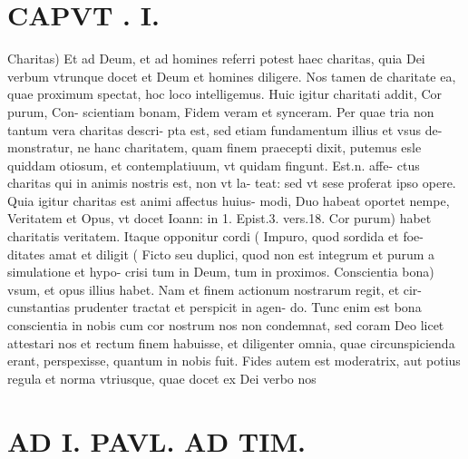 \documentclass{article}
\begin{document}
\begin{pages}
\section*{CAPVT . I. }
\marginpar{[ p.15 ]}\pstart Charitas) Et ad Deum, et ad homines referri potest haec charitas, quia Dei verbum vtrunque docet et Deum et homines diligere. Nos tamen de charitate ea, quae proximum spectat, hoc loco intelligemus. Huic igitur charitati addit, Cor purum, Con- scientiam bonam, Fidem veram et synceram. Per quae tria non tantum vera charitas descri- pta est, sed etiam fundamentum illius et vsus de- monstratur, ne hanc charitatem, quam finem praecepti dixit, putemus esle quiddam otiosum, et contemplatiuum, vt quidam fingunt. Est.n. affe- ctus charitas qui in animis nostris est, non vt la- teat: sed vt sese proferat ipso opere. Quia igitur charitas est animi affectus huius- modi, Duo habeat oportet nempe, Veritatem et Opus, vt docet Ioann: in 1. Epist.3. vers.18. Cor purum) habet charitatis veritatem. Itaque opponitur cordi ( Impuro, quod sordida et foe- ditates amat et diligit ( Ficto seu duplici, quod non est integrum et purum a simulatione et hypo- crisi tum in Deum, tum in proximos. Conscientia bona) vsum, et opus illius habet. Nam et finem actionum nostrarum regit, et cir- cunstantias prudenter tractat et perspicit in agen- do. Tunc enim est bona conscientia in nobis cum cor nostrum nos non condemnat, sed coram Deo licet attestari nos et rectum finem habuisse, et diligenter omnia, quae circunspicienda erant, perspexisse, quantum in nobis fuit. Fides autem est moderatrix, aut potius regula et norma vtriusque, quae docet ex Dei verbo nos  \pend
\section*{AD I. PAVL. AD TIM. }
\marginpar{[ p.16 ]}\pstart {}
{}

\end{pages}
\end{document}
